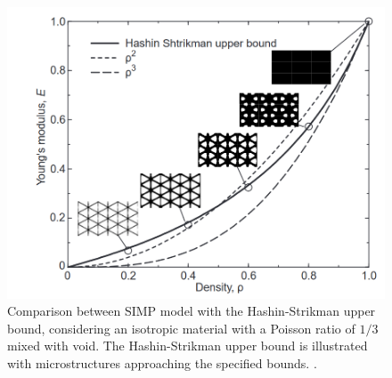 \begin{figure}
    \centering
    \includegraphics[width=0.75\linewidth]{figures/02_literature/simp.png}
    \caption{Comparison between SIMP model with the Hashin-Strikman upper bound, considering an isotropic material with a Poisson ratio of $1/3$ mixed with void. The Hashin-Strikman upper bound is illustrated with microstructures approaching the specified bounds. \cite{bendsoe_material_1999}.}
    \label{fig:02_simp}
\end{figure}

